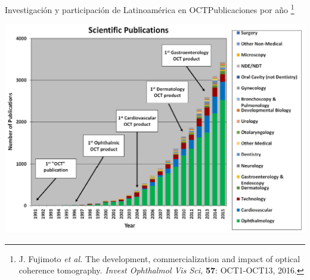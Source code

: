 \documentclass[fleqn,10pt]{beamer}
\newcommand\blfootnote[1]{%
	\begingroup
	\renewcommand\thefootnote{}\footnote{#1}%
	\addtocounter{footnote}{-1}%
	\endgroup
}
\begin{document}
\begin{frame}{Investigación y participación de Latinoamérica en OCT}{Publicaciones por año}
	\blfootnote{\tiny{J. Fujimoto \emph{et al.} The development, commercialization and impact of optical coherence tomography. \emph{Invest Ophthalmol Vis Sci,} \textbf{57}: OCT1-OCT13, 2016.}}
	\includegraphics[width=0.95\linewidth]{AAUgraphics/pt1/oct_pub_by_year}%
\end{frame}
\end{document}
